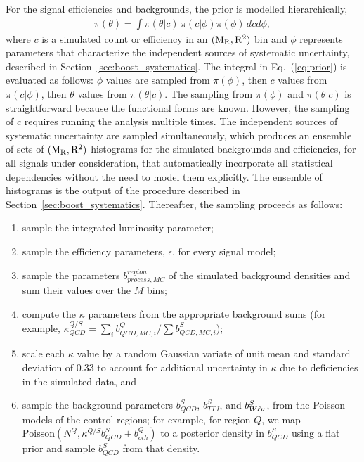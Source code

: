 For the signal efficiencies and backgrounds, the prior is modelled hierarchically,
\begin{align}
  \pi(\theta) = \int \pi(\theta | c ) \, \pi(c | \phi ) \pi(\phi) \, dc d\phi,
  \label{eq:prior}
\end{align}
where $c$ is a simulated count or efficiency in an $(\mathrm{M_R},  \mathrm{R^2})$ bin and $\phi$ represents
parameters that characterize the independent sources of systematic uncertainty, described in
Section~\ref{sec:boost_systematics}. 
The integral in Eq.~(\ref{eq:prior}) is evaluated as follows: $\phi$ values are sampled from
$\pi(\phi)$, then $c$ values from $\pi(c | \phi)$, then $\theta$ values from $\pi(\theta | c)$. 
The sampling from $\pi(\phi)$ and $\pi(\theta|c)$ is straightforward because the functional forms
are known. However, the sampling of $c$ requires running the analysis multiple times.
The independent sources of systematic uncertainty are sampled simultaneously, which produces an
ensemble of sets of $(\mathrm{M_R}, \mathrm{R^2})$ histograms for the simulated backgrounds and efficiencies, for all
signals under consideration, that automatically incorporate all statistical dependencies
without the need to model them explicitly.  The ensemble of histograms is the output of the
procedure described in Section~\ref{sec:boost_systematics}. Thereafter, the sampling proceeds as
follows:
\begin{enumerate}
\item sample the integrated luminosity parameter;
\item sample the efficiency parameters, $\epsilon$, for every signal model;
\item sample the parameters $b^{region}_{process, MC}$ of the simulated background densities and sum
their values over the $M$ bins;
\item compute the $\kappa$ parameters from the appropriate background sums (for example,
$\kappa^{Q/S}_{QCD} =  \sum_i  b^Q_{QCD, MC, i} / \sum b^S_{QCD, MC, i}$);
\item scale each $\kappa$ value by a random Gaussian variate of unit mean and standard deviation
of 0.33 to account for additional uncertainty in $\kappa$ due to deficiencies in the simulated
 data, and 
\item sample the background parameters $b^S_{QCD}$, $b^S_{TTJ}$, and $b^S_{W\ell\nu}$, from the 
Poisson models  of the control regions; for example, for region $Q$, we map  $\textrm{Poisson}(N^Q
, \kappa^{Q / S} b^S_{QCD} + b^Q_{oth})$ to a posterior density in $b^S_{QCD}$ using a flat prior
and sample $b^S_{QCD}$ from that density.
\end{enumerate}


